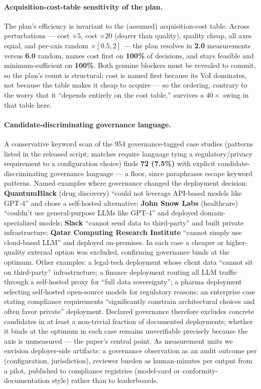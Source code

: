 \documentclass{article} %
\begin{document}
\paragraph{Acquisition-cost-table sensitivity of the plan.}
The plan's efficiency is invariant to the (assumed) acquisition-cost table. Across perturbations --- cost $\times 5$, cost $\times 20$ (dearer than quality), quality cheap, all axes equal, and per-axis random $\times[0.5, 2]$ --- the plan resolves in \textbf{2.0} measurements versus \textbf{6.0} random, names cost first on \textbf{100\%} of decisions, and stays feasible and minimum-sufficient on \textbf{100\%}. Both genuine blockers must be revealed to commit, so the plan's count is structural; cost is named first because its VoI dominates, not because the table makes it cheap to acquire --- so the ordering, contrary to the worry that it ``depends entirely on the cost table,'' survives a $40\times$ swing in that table here.

\paragraph{Candidate-discriminating governance language.}
A conservative keyword scan of the 954 governance-tagged case studies (patterns listed in the released script; matches require language tying a regulatory/privacy requirement to a configuration choice) finds \textbf{72 (7.5\%)} with explicit candidate-discriminating governance language --- a floor, since paraphrases escape keyword patterns. Named examples where governance changed the deployment decision: \textbf{QuantumBlack} (drug discovery) ``could not leverage API-based models like GPT-4'' and chose a self-hosted alternative; \textbf{John Snow Labs} (healthcare) ``couldn't use general-purpose LLMs like GPT-4'' and deployed domain-specialized models; \textbf{Slack} ``cannot send data to third-party'' and built private infrastructure; \textbf{Qatar Computing Research Institute} ``cannot simply use cloud-based LLM'' and deployed on-premises. In each case a cheaper or higher-quality external option was excluded, confirming governance binds at the optimum. Other examples: a legal-tech deployment whose client data ``cannot sit on third-party'' infrastructure; a finance deployment routing all LLM traffic through a self-hosted proxy for ``full data sovereignty''; a pharma deployment selecting self-hosted open-source models for regulatory reasons; an enterprise case stating compliance requirements ``significantly constrain architectural choices and often favor private'' deployment. Declared governance therefore excludes concrete candidates in at least a non-trivial fraction of documented deployments; whether it binds at the optimum in each case remains unverifiable precisely because the axis is unmeasured --- the paper's central point. As measurement units we envision deployer-side artifacts: a governance observation as an audit outcome per (configuration, jurisdiction), reviewer burden as human-minutes per output from a pilot, published to compliance registries (model-card or conformity-documentation style) rather than to leaderboards.
\end{document}

